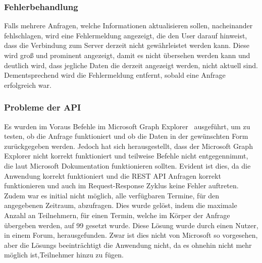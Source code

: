 \subsubsection{Fehlerbehandlung}\label{subsubsec:fehlerbehandlung-REST}
Falls mehrere Anfragen, welche Informationen aktualisieren sollen, nacheinander fehlschlagen, wird eine Fehlermeldung angezeigt, die den User darauf hinweist, dass die Verbindung zum Server derzeit nicht gewährleistet werden kann.
Diese wird groß und prominent angezeigt, damit es nicht übersehen werden kann und deutlich wird, dass jegliche Daten die derzeit angezeigt werden, nicht aktuell sind.
Dementsprechend wird die Fehlermeldung entfernt, sobald eine Anfrage erfolgreich war.
\newline
\newline
\subsubsection{Probleme der API}\label{subsubsec:probleme-der-api}
Es wurden im Voraus Befehle im Microsoft Graph Explorer~\cite{Microsoft-Graph-Explorer} ausgeführt, um zu testen, ob die Anfrage funktioniert und ob die Daten in der gewünschten Form zurückgegeben werden.
Jedoch hat sich herausgestellt, dass der Microsoft Graph Explorer nicht korrekt funktioniert und teilweise Befehle nicht entgegennimmt, die laut Microsoft Dokumentation funktionieren sollten.
Evident ist dies, da die Anwendung korrekt funktioniert und die REST API Anfragen korrekt funktionieren und auch im Request-Response Zyklus keine Fehler auftreten.
\newline
\newline
Zudem war es initial nicht möglich, alle verfügbaren Termine, für den angegebenen Zeitraum, abzufragen.
Dies wurde gelöst, indem die maximale Anzahl an Teilnehmern, für einen Termin, welche im Körper der Anfrage übergeben werden, auf 99 gesetzt wurde.
Diese Lösung wurde durch einen Nutzer, in einem Forum, herausgefunden.
Zwar ist dies nicht von Microsoft so vorgesehen, aber die Lösungs beeinträchtigt die Anwendung nicht, da es ohnehin nicht mehr möglich ist,Teilnehmer hinzu zu fügen.
\newline
\newline
